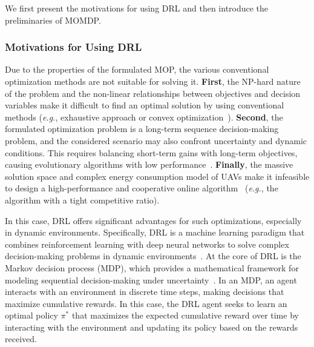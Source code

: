 \documentclass[10pt,journal,compsoc]{IEEEtran}
\begin{document}
\par We first present the motivations for using DRL and then introduce the preliminaries of MOMDP. 

\subsubsection{Motivations for Using DRL}

\par Due to the properties of the formulated MOP, the various conventional optimization methods are not suitable for solving it. \textbf{First}, the NP-hard nature of the problem and the non-linear relationships between objectives and decision variables make it difficult to find an optimal solution by using conventional methods (\textit{e.g.}, exhaustive approach or convex optimization~\cite{Nievergelt2000, boyd2004convex}). \textbf{Second}, the formulated optimization problem is a long-term sequence decision-making problem, and the considered scenario may also confront uncertainty and dynamic conditions. This requires balancing short-term gains with long-term objectives, causing evolutionary algorithms with low performance~\cite{Bliss2014}. \textbf{Finally},  the massive solution space and complex energy consumption model of UAVs make it infeasible to design a high-performance and cooperative online algorithm~\cite{nikolos2003evolutionary} (\textit{e.g.}, the algorithm with a tight competitive ratio). 

\par In this case, DRL offers significant advantages for such optimizations, especially in dynamic environments. Specifically, DRL is a machine learning paradigm that combines reinforcement learning with deep neural networks to solve complex decision-making problems in dynamic environments~\cite{Nguyen2020}. At the core of DRL is the Markov decision process (MDP), which provides a mathematical framework for modeling sequential decision-making under uncertainty~\cite{guo2022real}. In an MDP, an agent interacts with an environment in discrete time steps, making decisions that maximize cumulative rewards. In this case, the DRL agent seeks to learn an optimal policy $\pi^*$ that maximizes the expected cumulative reward over time by interacting with the environment and updating its policy based on the rewards received.
\end{document}
